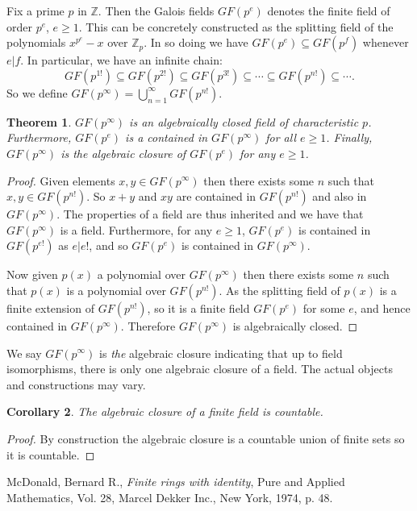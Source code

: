 \documentclass[12pt]{article}
\newtheorem{thm}{Theorem}
\newtheorem{coro}[thm]{Corollary}
\providecommand{\bigunion}{\bigcup}
\begin{document}
Fix a prime $p$ in $\mathbb{Z}$.  Then the Galois fields $GF(p^e)$ denotes the
finite field of order $p^e$, $e\geq 1$.  This can be concretely constructed as 
the splitting field of the polynomials $x^{p^e}-x$ over $\mathbb{Z}_p$.  In so doing we
have $GF(p^{e})\subseteq GF(p^{f})$ whenever $e|f$.  In particular, we have an
infinite chain:
\[GF(p^{1!})\subseteq GF(p^{2!})\subseteq GF(p^{3!})\subseteq\cdots \subseteq
    GF(p^{n!})\subseteq\cdots.\]
So we define $\displaystyle GF(p^{\infty})=\bigunion_{n=1}^\infty GF(p^{n!})$.

\begin{thm}
$GF(p^{\infty})$ is an algebraically closed field of characteristic $p$.
Furthermore, $GF(p^e)$ is a contained in $GF(p^{\infty})$ for all $e\geq 1$.
Finally, $GF(p^\infty)$ is the algebraic closure of $GF(p^e)$ for any $e\geq 1$.
\end{thm}
\begin{proof}
Given elements $x,y\in GF(p^\infty)$ then there exists some $n$ such that
$x,y\in GF(p^{n!})$.  So $x+y$ and $xy$ are contained in $GF(p^{n!})$ and also
in $GF(p^\infty)$.  The properties of a field are thus inherited and we have
that $GF(p^\infty)$ is a field.  Furthermore, for any $e\geq 1$, $GF(p^e)$ is
contained in $GF(p^{e!})$ as $e|e!$, and so $GF(p^e)$ is contained in $GF(p^\infty)$.

Now given $p(x)$ a polynomial over $GF(p^\infty)$ then there exists some $n$ 
such that $p(x)$ is a polynomial over $GF(p^{n!})$.  As the splitting field 
of $p(x)$ is a finite extension of $GF(p^{n!})$, so it is a finite field 
$GF(p^{e})$ for some $e$, and hence contained in $GF(p^\infty)$.  Therefore 
$GF(p^\infty)$ is algebraically closed.
\end{proof}

We say $GF(p^\infty)$ is \emph{the} algebraic closure indicating that up to field 
isomorphisms, there is only one algebraic closure of a field.  The actual objects 
and constructions may vary.

\begin{coro}
The algebraic closure of a finite field is countable.
\end{coro}
\begin{proof}
By construction the algebraic closure is a countable union of finite sets so
it is countable.
\end{proof}


\providecommand{\bysame}{\leavevmode\hbox to3em{\hrulefill}\thinspace}
\providecommand{\MR}{\relax\ifhmode\unskip\space\fi MR }
\providecommand{\MRhref}[2]{%
\href{http://www.ams.org/mathscinet-getitem?mr=#1}{#2}
}
\providecommand{\href}[2]{#2}
\begin{thebibliography}{10}

McDonald, Bernard R.,
\emph{Finite rings with identity}, Pure and Applied Mathematics, Vol. 28,
Marcel Dekker Inc., New York, 1974, p. 48.

\end{thebibliography}





\end{document}
